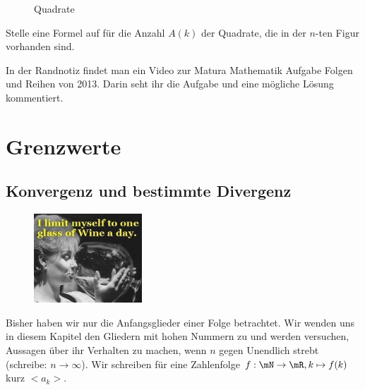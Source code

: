\documentclass[%
11pt,%
twoside,%
titlepage,%
german,%
headsepline%
]{scrartcl}
\begin{document}
\begin{ueb}[Quadrate]
\begin{figure}
{
}
\caption{Quadrate}\label{ueb:quadrate}
\end{figure}
Stelle eine Formel auf f\"ur die Anzahl $A(k)$ der Quadrate, die in der $n$-ten Figur vorhanden sind.
\end{ueb}

\begin{ueb}
In
der Randnotiz findet man ein Video zur Matura Mathematik Aufgabe Folgen und Reihen von 2013. Darin seht ihr die Aufgabe und eine mögliche Lösung kommentiert.
\end{ueb}

\section{Grenzwerte}
\subsection{Konvergenz und bestimmte Divergenz}
\begin{figure}
\vspace{-23pt}
  \begin{center}
    \includegraphics[width=0.36\textwidth]{pictures/limit}
  \end{center}
\vspace{-20pt}
\end{figure}
Bisher haben wir nur die Anfangsglieder einer Folge betrachtet. Wir wenden uns in diesem Kapitel den Gliedern mit hohen Nummern zu und werden versuchen, Aussagen \"uber ihr Verhalten zu machen, wenn $n$ gegen Unendlich strebt (schreibe: $n\to\infty$).
Wir schreiben f\"ur eine Zahlenfolge $f:\mN\to\mR, k\mapsto f(k)$ kurz $<a_k>$.
\end{document}
